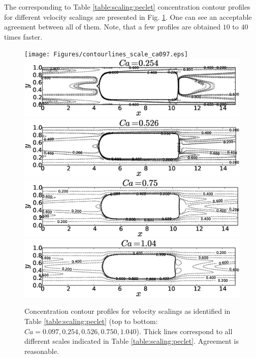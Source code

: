 \documentclass{article}
\begin{document}
The corresponding to Table \ref{table:scaling:peclet} concentration contour profiles for different
velocity scalings are presented in Fig. \ref{fig:contours:scaling:peclet}. One can see an
acceptable agreement between all of them. Note, that a few profiles are obtained $10$ to $40$ times
faster.
\begin{figure}[htb!]
\texttt{[image: Figures/contourlines\_scale\_ca097.eps]}\\
\includegraphics[height=0.25\textwidth]{Figures/contourlines_scale_ca054.eps}\\
\includegraphics[height=0.25\textwidth]{Figures/contourlines_scale_ca026.eps}\\
\includegraphics[height=0.25\textwidth]{Figures/contourlines_scale_ca05.eps}\\
\includegraphics[height=0.25\textwidth]{Figures/contourlines_scale_ca14.eps}\\
\caption{Concentration contour profiles for velocity scalings as identified in Table
\ref{table:scaling:peclet} (top to bottom:
$Ca=0.097,0.254,0.526,0.750,1.040$). Thick lines correspond to
all different scales indicated in Table
\ref{table:scaling:peclet}. Agreement is reasonable. \label{fig:contours:scaling:peclet}}
\end{figure}
\end{document}
